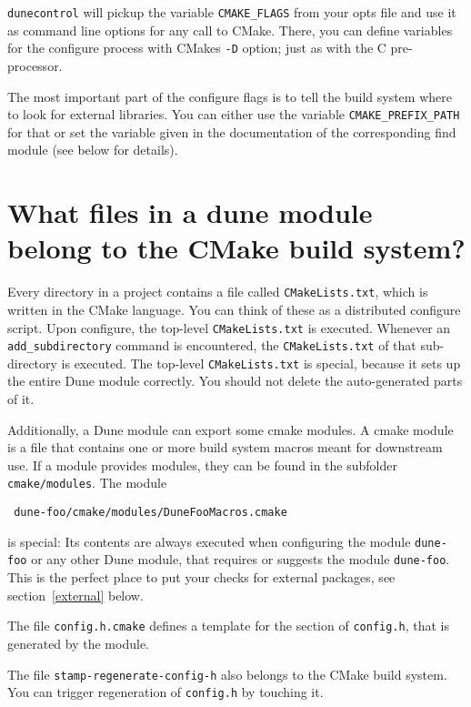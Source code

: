 \documentclass[a4paper,10pt,DIV9,headings=small]{scrartcl}
\newcommand{\cmakelists}{\lstinline!CMakeLists.txt!\xspace}
\newcommand{\dunecontrol}{\lstinline!dunecontrol!\xspace}
\begin{document}
\dunecontrol will pickup the variable \lstinline!CMAKE_FLAGS! from your opts file and use it as command line options for
any call to CMake. There, you can define variables for the configure process with CMakes \lstinline!-D! option; just as
with the C pre-processor.

The most important part of the configure flags is to tell the build system where to look for external libraries. You can either use the variable \lstinline!CMAKE_PREFIX_PATH! for that or set the variable given in the documentation of the corresponding find module (see below for details).

\section{What files in a dune module belong to the CMake build system?}
\label{files}
Every directory in a project contains a file called \cmakelists, which is written in the CMake language.
You can think of these as a distributed configure script. Upon configure, the top-level \cmakelists is executed.
Whenever an \lstinline!add_subdirectory! command is encountered, the \cmakelists of that sub-directory is executed.
The top-level \cmakelists is special, because it sets up the entire Dune module correctly. You should not delete the
auto-generated parts of it.

Additionally, a Dune module can export some cmake modules. A cmake module is a file that contains one or more build system macros meant for downstream use. If a module provides modules, they can be found in the subfolder \lstinline!cmake/modules!. The module
\begin{lstlisting}
 dune-foo/cmake/modules/DuneFooMacros.cmake
\end{lstlisting}
is special: Its contents are always executed when configuring the module \lstinline!dune-foo! or any other Dune module, that
requires or suggests the module \lstinline!dune-foo!. This is the perfect place to put your checks for external packages,
see section~\ref{external} below.

The file \lstinline!config.h.cmake! defines a template for the section of \lstinline!config.h!, that is generated by the module.

The file \lstinline!stamp-regenerate-config-h! also belongs to the CMake build system. You can trigger regeneration of \lstinline!config.h! by touching it.
\end{document}
